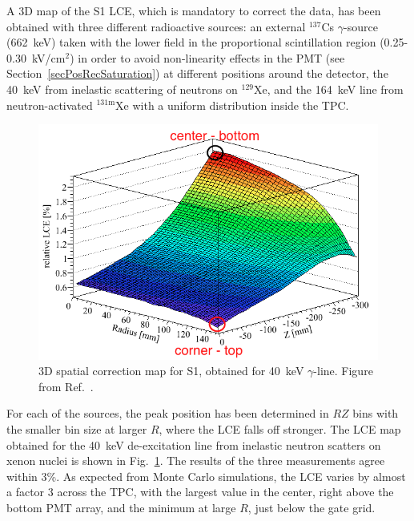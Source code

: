 A 3D map of the S1 LCE, which is mandatory to correct the data, has been obtained with three different radioactive sources: an external $^{137}$Cs $\gamma$-source (662~keV) taken with the lower field in the proportional scintillation region (0.25-0.30~kV/cm$^{2}$) in order to avoid non-linearity effects in the PMT (see Section~\ref{secPosRecSaturation}) at different positions around the detector, the 40~keV from inelastic scattering of neutrons on $^{129}$Xe, and the 164~keV line from neutron-activated $^{131\mathrm{m}}$Xe with a uniform distribution inside the TPC.

\begin{figure}[!h]
\centering
\includegraphics[width=0.6\linewidth]{plots/LCEs1/S1correctionMap_withLabels.png}
\caption[3D spatial correction map for S1, obtained for 40~keV $\gamma$-line]{3D spatial correction map for S1, obtained for 40~keV $\gamma$-line. Figure from Ref.~\cite{xe100-instrument}.}
\label{figCorrectionMapS1}
\end{figure}

For each of the sources, the peak position has been determined in $RZ$ bins with the smaller bin size at larger $R$, where the LCE falls off stronger. The LCE map obtained for the 40~keV de-excitation line from inelastic neutron scatters on xenon nuclei is shown in Fig.~\ref{figCorrectionMapS1}. The results of the three measurements agree within 3\%. As expected from Monte Carlo simulations, the LCE varies by almost a factor 3 across the TPC, with the largest value in the center, right above the bottom PMT array, and the minimum at large $R$, just below the gate grid.




